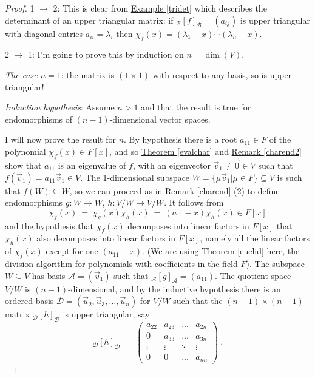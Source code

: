 \documentclass[11pt]{amsbook}
\theoremstyle{definition}
\begin{document}
\begin{proof}
1 $\to$ 2: This is clear from \hyperref[tridet]{Example \ref{tridet}} which describes the determinant of an upper triangular matrix: if ${}_{\mathcal{B}}[f]_{\mathcal{B}}=(a_{ij})$ is upper triangular with diagonal entries $a_{ii}=\lambda_i$ then $\chi_f(x) = (\lambda_1 -x)\cdots (\lambda_n -x)$.

2 $\to$ 1: I'm going to prove this by induction on $n = \dim(V)$.

\noindent
{\it The case $n=1$}: the matrix is $(1\times 1)$ with respect to any basis, so is upper triangular!

\noindent
{\it Induction hypothesis}: Assume $n>1$ and that the result is true for endomorphisms of $(n-1)$-dimensional vector spaces.

I will now prove the result for $n$. By hypothesis there is a root $a_{11}\in F$ of the polynomial $\chi_f(x) \in F[x]$, and so \hyperref[evalchar]{Theorem \ref{evalchar}} and
\hyperref[charend2]{Remark \ref{charend2}}
show that $a_{11}$ is an eigenvalue of $f$, with an eigenvector $\vec{v}_1
\neq \vec{0} \in V$ such that $f(\vec{v}_1)=a_{11}\vec{v}_1 \in V$. The 1-dimensional subspace $W = \{ \mu \vec{v}_1|\mu \in F\} \subseteq V$ is such that $f(W) \subseteq W$, so we can proceed as in \hyperref[charend]{Remark \ref{charend}}
(2) to define endomorphisms $g:W \to W$, $h:V/W \to V/W$. It follows from
$$\chi_f(x)~=~\chi_g(x)\chi_h(x)~=~(a_{11}-x)\chi_h(x) \in F[x]$$
and the hypothesis that $\chi_f(x)$ decomposes into linear factors in $F[x]$ that $\chi_h(x)$
also decomposes into linear factors in $F[x]$, namely all the linear factors
of $\chi_f(x)$ except for one $(a_{11}-x)$. (We are using
 \hyperref[euclid]{Theorem \ref{euclid}} here, the division algorithm for polynomials with coefficients in the field $F$). The subspace $W \subseteq V$ has basis ${\mathcal A}=(\vec{v}_1)$ such that $_{\mathcal A}[g]_{\mathcal A}=(a_{11})$. The quotient space $V/W$ is $(n-1)$-dimensional, and by the inductive hypothesis there is an ordered basis ${\mathcal D}=(\vec{u}_2,\vec{u}_3,\dots,\vec{u}_n)$ for $V/W$ such that the $(n-1)\times (n-1)$-matrix
$_{\mathcal D}[h]_{\mathcal D}$ is upper triangular, say
$$_{\mathcal D}[h]_{\mathcal D}~=~\begin{pmatrix} a_{22} & a_{23} & \dots &a_{2 n}\\
0 & a_{33} & \dots &a_{3 n}\\
\vdots & \vdots & \ddots & \vdots \\
0 & 0 & \dots &a_{nn}\end{pmatrix}~.$$

\end{proof}
\end{document}
